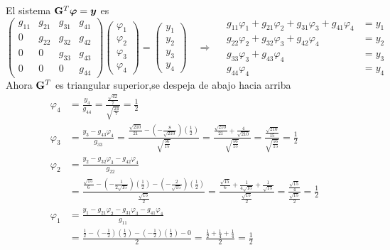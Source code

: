El sistema $\mathbf{G}^T\bm{\varphi} = \bm{y}$ es
\[
\begin{pmatrix}
	g_{11} & g_{21} & g_{31} & g_{41}\\
	0 & g_{22} & g_{32} & g_{42}\\
	0 & 0 & g_{33} & g_{43}\\
	0 & 0 & 0 & g_{44}
\end{pmatrix}
\begin{pmatrix} \varphi_1\\ \varphi_2\\ \varphi_3\\ \varphi_4 \end{pmatrix}
=
\begin{pmatrix} y_1\\ y_2\\ y_3\\ y_4 \end{pmatrix}
\quad\Longrightarrow\quad
\begin{aligned}
	g_{11}\varphi_1 + g_{21}\varphi_2 + g_{31}\varphi_3 + g_{41}\varphi_4 &= y_1\\
	g_{22}\varphi_2 + g_{32}\varphi_3 + g_{42}\varphi_4 &= y_2\\
	g_{33}\varphi_3 + g_{43}\varphi_4 &= y_3\\
	g_{44}\varphi_4 &= y_4
\end{aligned}
\]
Ahora $\mathbf{G}^T$ es triangular superior,se despeja de abajo hacia arriba
\begin{align*}
	\varphi_4 &= \frac{y_4}{g_{44}} = \frac{\tfrac{\sqrt{42}}{7}}{\sqrt{\tfrac{24}{7}}} = \frac12\\[8pt]
	\varphi_3 &= \frac{y_3 - g_{43}\varphi_4}{g_{33}}
	= \frac{\tfrac{\sqrt{210}}{21} - \left(-\tfrac{8}{\sqrt{210}}\right)\left(\tfrac12\right)}{\sqrt{\tfrac{56}{15}}}
	= \frac{\tfrac{\sqrt{210}}{21} + \tfrac{4}{\sqrt{210}}}{\sqrt{\tfrac{56}{15}}} = \frac{\tfrac{\sqrt{210}}{15}}{\sqrt{\tfrac{56}{15}}} = \frac12\\[8pt]
	\varphi_2 &= \frac{y_2 - g_{32}\varphi_3 - g_{42}\varphi_4}{g_{22}}\\
	&= \frac{\tfrac{\sqrt{15}}{6} - \left(-\tfrac{1}{2\sqrt{15}}\right)\left(\tfrac12\right) - \left(-\tfrac{2}{\sqrt{15}}\right)\left(\tfrac12\right)}{\tfrac{\sqrt{15}}{2}}
	= \frac{\tfrac{\sqrt{15}}{6} + \tfrac{1}{4\sqrt{15}} + \tfrac{1}{\sqrt{15}}}{\tfrac{\sqrt{15}}{2}} = \frac{\tfrac{\sqrt{15}}{4}}{\tfrac{\sqrt{15}}{2}} = \frac12\\[8pt]
	\varphi_1 &= \frac{y_1 - g_{21}\varphi_2 - g_{31}\varphi_3 - g_{41}\varphi_4}{g_{11}}\\
	&= \frac{\tfrac12 - \left(-\tfrac12\right)\left(\tfrac12\right) - \left(-\tfrac12\right)\left(\tfrac12\right) - 0}{2}
	= \frac{\tfrac12 + \tfrac14 + \tfrac14}{2} = \frac12
\end{align*}


